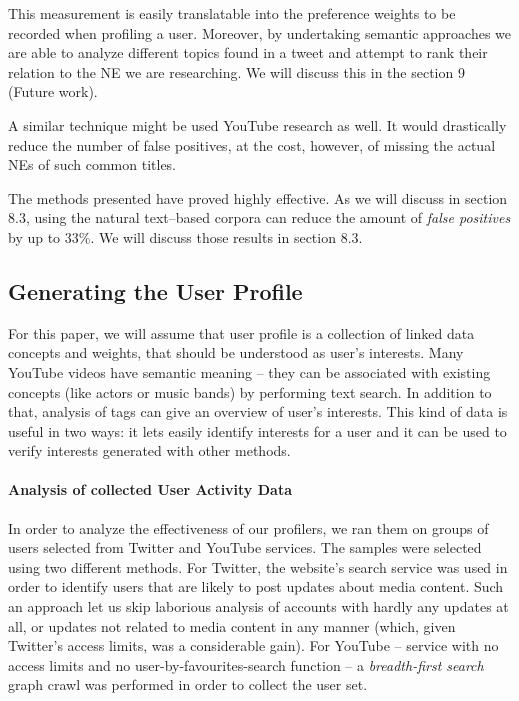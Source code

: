 This measurement is easily translatable into the preference weights to be recorded when profiling a user.
Moreover, by undertaking semantic approaches we are able to analyze different topics found in a tweet and
attempt to rank their relation to the NE we are researching. We will discuss this in the section 9 (Future work).

A similar technique might be used YouTube research as well. It would drastically reduce the number of
false positives, at the cost, however, of missing the actual NEs of such common titles.

The methods presented have proved highly effective. As we will discuss in section 8.3, using the natural
text--based corpora can reduce the amount of \textit{false positives} by up to 33\%. We will discuss those
results in section 8.3.

\subsection{Generating the User Profile}

For this paper, we will assume that user profile is a collection of linked data concepts and weights,
that should be understood as user's interests. Many YouTube videos have semantic meaning -- they can
be associated with existing concepts (like actors or music bands) by performing text search.
In addition to that, analysis of tags can give an overview of user's interests. This kind of data is
useful in two ways: it lets easily identify interests for a user and it can be
used to verify interests generated with other methods.

\paragraph{Analysis of collected User Activity Data}
In order to analyze the effectiveness of our profilers, we ran them on groups of
users selected from Twitter and YouTube services. The samples were selected
using two different methods. For Twitter, the website's search service was used
in order to identify users that are likely to post updates about media content.
Such an approach let us skip laborious analysis of accounts with hardly any
updates at all, or updates not related to media content in any manner (which,
given Twitter's access limits, was a considerable gain). For YouTube -- service
with no access limits and no user-by-favourites-search function -- a \textit{breadth-first search}
graph crawl was performed in order to collect the user set.

